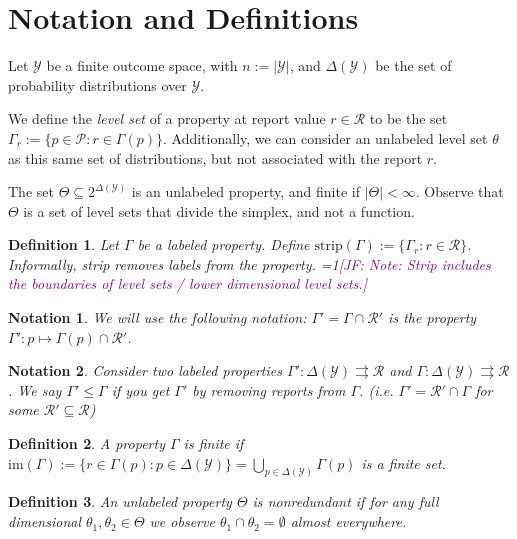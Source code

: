 \documentclass[12pt]{article}
\newcommand{\Comments}{1}
\newcommand{\mynote}[2]{\ifnum\Comments=1\textcolor{#1}{#2}\fi}
\newcommand{\jessie}[1]{\mynote{purple}{[JF: #1]}}
\renewcommand{\P}{\mathcal{P}}
\newcommand{\R}{\mathcal{R}}
\newcommand{\Y}{\mathcal{Y}}
\newcommand{\toto}{\rightrightarrows}
\newcommand{\im}{\text{im}}
\newtheorem{definition}{Definition}
\newtheorem{notation}{Notation}
\begin{document}
\section{Notation and Definitions}


Let $\Y$ be a finite outcome space, with $n:=|\Y|$, and $\Delta(\Y)$ be the set of probability distributions over $\Y$.

We define the \emph{level set} of a property at report value $r\in\R$ to be the set $\Gamma_r := \{p\in\P : r \in \Gamma(p)\}$.
Additionally, we can consider an unlabeled level set $\theta$ as this same set of distributions, but not associated with the report $r$.

The set $\Theta \subseteq 2^{\Delta(\Y)}$ is an unlabeled property, and finite if $|\Theta| < \infty$.
Observe that $\Theta$ is a set of level sets that divide the simplex, and not a function.


\begin{definition}
Let $\Gamma$ be a labeled property.
Define $\text{strip}(\Gamma) := \{ \Gamma_r : r \in \R \}$.
Informally, strip removes labels from the property.
\jessie{Note: Strip includes the boundaries of level sets / lower dimensional level sets.}
\end{definition}

\begin{notation}
We will use the following notation: $\Gamma' = \Gamma \cap \R'$ is the property $\Gamma' : p \mapsto \Gamma(p) \cap \R'$.  
\end{notation}

\begin{notation}
  Consider two labeled properties $\Gamma' : \Delta(\Y) \toto \R$ and $\Gamma : \Delta(\Y) \toto \R$.
  We say $\Gamma' \leq \Gamma$ if you get $\Gamma'$ by removing reports from $\Gamma$.
  (i.e. $\Gamma' = \R' \cap \Gamma$ for some $\R' \subseteq \R$)
\end{notation}

\begin{definition}
A property $\Gamma$ is \emph{finite} if $\im(\Gamma) := \{r\in\Gamma(p) : p\in\Delta(\Y)\} = \bigcup_{p\in\Delta(\Y)} \Gamma(p)$ is a finite set.
\end{definition}

\begin{definition}\label{def:unlabeled-nonredundant}
  An unlabeled property $\Theta$ is \emph{nonredundant} if for any full dimensional $\theta_1, \theta_2 \in \Theta$ we observe $\theta_1 \cap \theta_2 = \emptyset$ almost everywhere.
\end{definition}
\end{document}
